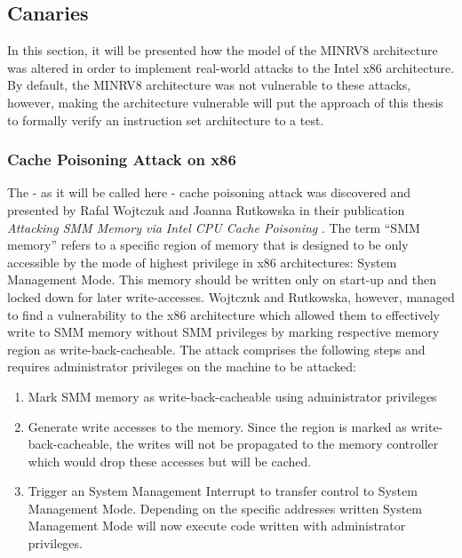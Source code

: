 \subsection{Canaries}
\label{sec:canaries}

In this section, it will be presented how the model of the MINRV8 architecture was altered in order to implement real-world attacks to the Intel x86 architecture.
By default, the MINRV8 architecture was not vulnerable to these attacks, however, making the architecture vulnerable will put the approach of this thesis to formally verify an instruction set architecture to a test.

\subsubsection{Cache Poisoning Attack on x86}

The - as it will be called here - cache poisoning attack was discovered and presented by Rafal Wojtczuk and Joanna Rutkowska in their publication \textit{Attacking SMM Memory via Intel CPU Cache Poisoning} \cite{Wojtczuk09}.
The term \enquote{SMM memory} refers to a specific region of memory that is designed to be only accessible by the mode of highest privilege in x86 architectures: System Management Mode.
This memory should be written only on start-up and then locked down for later write-accesses.
Wojtczuk and Rutkowska, however, managed to find a vulnerability to the x86 architecture which allowed them to effectively write to SMM memory without SMM privileges by marking respective memory region as write-back-cacheable.
The attack comprises the following steps and requires administrator privileges on the machine to be attacked:
\begin{enumerate}
    \item Mark SMM memory as write-back-cacheable using administrator privileges
    \item \label{itm:cache-pois-mem}
    Generate write accesses to the memory.
    Since the region is marked as write-back-cacheable, the writes will not be propagated to the memory controller which would drop these accesses but will be cached.
    \item \label{itm:cache-pois-smi}
    Trigger an System Management Interrupt to transfer control to System Management Mode.
    Depending on the specific addresses written System Management Mode will now execute code written with administrator privileges.
\end{enumerate}


